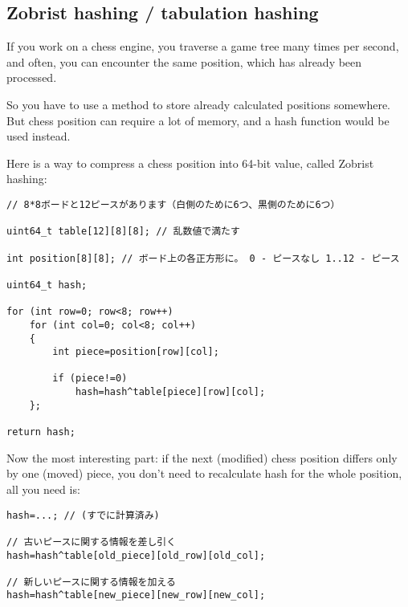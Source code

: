 ﻿\subsection{Zobrist hashing / tabulation hashing}

If you work on a chess engine, you traverse a game tree many times per second, and often, you can encounter
the same position, which has already been processed.

So you have to use a method to store already calculated positions somewhere.
But chess position can require a lot of memory, and a hash function would be used instead.

Here is a way to compress a chess position into 64-bit value, called Zobrist hashing:

\begin{lstlisting}[style=customc]
// 8*8ボードと12ピースがあります（白側のために6つ、黒側のために6つ）

uint64_t table[12][8][8]; // 乱数値で満たす

int position[8][8]; // ボード上の各正方形に。 0 - ピースなし 1..12 - ピース

uint64_t hash;

for (int row=0; row<8; row++)
	for (int col=0; col<8; col++)
	{
		int piece=position[row][col];

		if (piece!=0)
			hash=hash^table[piece][row][col];
	};

return hash;
\end{lstlisting}

Now the most interesting part: if the next (modified) chess position differs only by one (moved) piece,
you don't need to recalculate hash for the whole position, all you need is:

\begin{lstlisting}[style=customc]
hash=...; // (すでに計算済み)

// 古いピースに関する情報を差し引く
hash=hash^table[old_piece][old_row][old_col];

// 新しいピースに関する情報を加える
hash=hash^table[new_piece][new_row][new_col];
\end{lstlisting}
